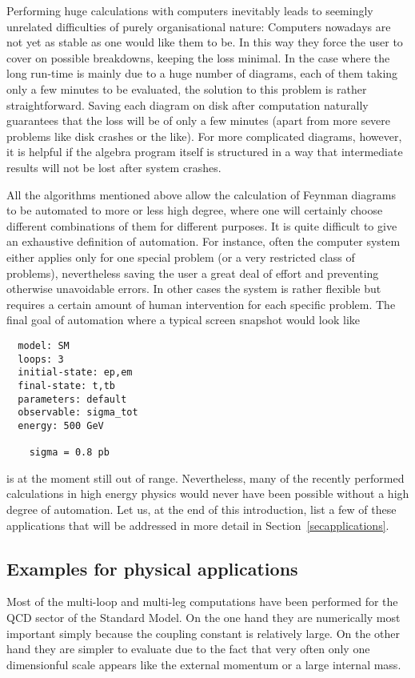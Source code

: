 Performing huge calculations with computers inevitably leads to seemingly
unrelated difficulties of purely organisational nature: Computers
nowadays are not yet as stable as one would like them to be. In this way
they force the user to cover on possible breakdowns, keeping the loss
minimal. In the case where the long run-time is mainly due to a huge
number of diagrams, each of them taking only a few minutes to be
evaluated, the solution to this problem is rather straightforward.
Saving each diagram on disk after computation naturally guarantees that
the loss will be of only a few minutes (apart from more severe problems
like disk crashes or the like).  For more complicated diagrams, however,
it is helpful if the algebra program itself is structured in a way that
intermediate results will not be lost after system crashes.

All the algorithms mentioned above allow the calculation of Feynman
diagrams to be automated to more or less high degree, where one will
certainly choose different combinations of them for different purposes.
It is quite difficult to give an exhaustive definition of automation.
For instance, often the computer system either applies only for one
special problem (or a very restricted class of problems), nevertheless
saving the user a great deal of effort and preventing otherwise unavoidable
errors. In other cases the system is rather flexible but requires a
certain amount of human intervention for each specific problem.  The
final goal of automation where a typical screen snapshot would look like
\begin{verbatim}
  model: SM 
  loops: 3 
  initial-state: ep,em 
  final-state: t,tb 
  parameters: default 
  observable: sigma_tot 
  energy: 500 GeV

    sigma = 0.8 pb

\end{verbatim}
is at the moment still out of range.
Nevertheless, many of the recently performed calculations in high energy
physics would never have been possible without a high degree of
automation. Let us, at the end of this introduction, list a few of these
applications that will be addressed in more detail in
Section~\ref{secapplications}.

\subsection{Examples for physical applications}
%
Most of the multi-loop and multi-leg computations have been performed
for the QCD sector of the Standard Model. On the one hand they are
numerically most important simply because the coupling constant is
relatively large. On the other hand they are simpler to evaluate due to
the fact that very often only one dimensionful scale appears like the
external momentum or a large internal mass.

